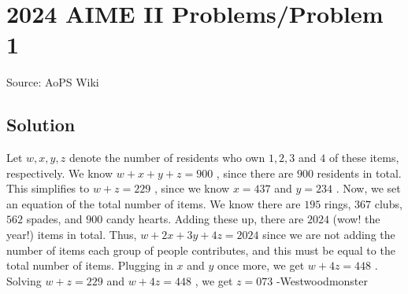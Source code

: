 \documentclass[12pt]{article}
\begin{document}
\section*{{2024 AIME II Problems/Problem 1}}
Source: AoPS Wiki

\subsection*{Solution}
Let $w,x,y,z$ denote the number of residents who own $1,2,3$ and $4$ of these items, respectively. We know $w+x+y+z=900$ , since there are $900$ residents in total. This simplifies to $w+z=229$ , since we know $x=437$ and $y=234$ . Now, we set an equation of the total number of items. We know there are $195$ rings, $367$ clubs, $562$ spades, and $900$ candy hearts. Adding these up, there are $2024$ (wow! the year!) items in total. Thus, $w+2x+3y+4z=2024$ since we are not adding the number of items each group of people contributes, and this must be equal to the total number of items. Plugging in $x$ and $y$ once more, we get $w+4z=448$ . Solving $w+z=229$ and $w+4z=448$ , we get $z=\boxed{073}$ -Westwoodmonster
\end{document}

